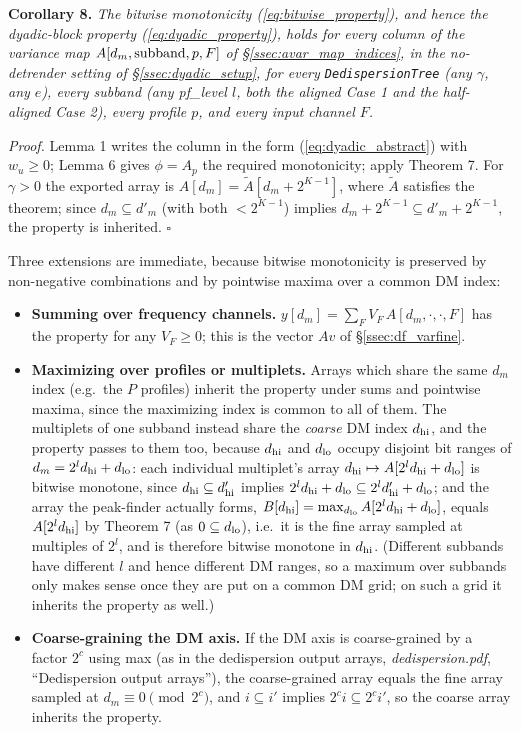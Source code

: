 \documentclass{article}
\numberwithin{equation}{section}   %
\newcommand{\ddnotes}[1]{{\em dedispersion.pdf}, ``#1''}
\begin{document}
\medskip
\par\noindent
{\bf Corollary 8.}
{\em The bitwise monotonicity (\ref{eq:bitwise_property}), and hence the dyadic-block property
(\ref{eq:dyadic_property}), holds for every column of the variance map
$A[d_m, \mbox{\rm subband}, p, F]$ of \S\ref{ssec:avar_map_indices}, in the no-detrender setting
of \S\ref{ssec:dyadic_setup}, for every {\tt DedispersionTree} (any $\gamma$, any $e$), every
subband (any pf\_level $l$, both the aligned Case 1 and the half-aligned Case 2), every
profile $p$, and every input channel $F$.}

\medskip
\par\noindent
{\em Proof.} Lemma 1 writes the column in the form (\ref{eq:dyadic_abstract}) with
$w_u \ge 0$; Lemma 6 gives $\phi = A_p$ the required monotonicity; apply Theorem 7. For
$\gamma>0$ the exported array is $A[d_m] = \tilde A[d_m + 2^{K-1}]$, where $\tilde A$
satisfies the theorem; since $d_m \subseteq d'_m$ (with both $< 2^{K-1}$) implies
$d_m + 2^{K-1} \subseteq d'_m + 2^{K-1}$, the property is inherited. $\square$

\medskip
\par\noindent
Three extensions are immediate, because bitwise monotonicity is preserved by non-negative
combinations and by pointwise maxima over a common DM index:
\begin{itemize}
\item {\bf Summing over frequency channels.} $y[d_m] = \sum_F V_F \, A[d_m,\cdot,\cdot,F]$
has the property for any $V_F \ge 0$; this is the vector $Av$ of \S\ref{ssec:df_varfine}.
\item {\bf Maximizing over profiles or multiplets.} Arrays which share the same $d_m$ index
(e.g.\ the $P$ profiles) inherit the property under sums and pointwise maxima, since the
maximizing index is common to all of them. The multiplets of one subband instead share the
{\em coarse} DM index $d_{\rm hi}$, and the property passes to them too, because $d_{\rm hi}$
and $d_{\rm lo}$ occupy disjoint bit ranges of $d_m = 2^l d_{\rm hi} + d_{\rm lo}$: each
individual multiplet's array $d_{\rm hi} \mapsto A[2^l d_{\rm hi} + d_{\rm lo}]$ is bitwise
monotone, since $d_{\rm hi} \subseteq d'_{\rm hi}$ implies
$2^l d_{\rm hi} + d_{\rm lo} \subseteq 2^l d'_{\rm hi} + d_{\rm lo}$; and the array the
peak-finder actually forms,
$B[d_{\rm hi}] = \max_{d_{\rm lo}} A[2^l d_{\rm hi} + d_{\rm lo}]$, equals
$A[2^l d_{\rm hi}]$ by Theorem 7 (as $0 \subseteq d_{\rm lo}$), i.e.\ it is the fine array
sampled at multiples of $2^l$, and is therefore bitwise monotone in $d_{\rm hi}$. (Different
subbands have different $l$ and hence different DM ranges, so a maximum over subbands only
makes sense once they are put on a common DM grid; on such a grid it inherits the property
as well.)
\item {\bf Coarse-graining the DM axis.} If the DM axis is coarse-grained by a factor $2^c$
using max (as in the dedispersion output arrays, \ddnotes{Dedispersion output arrays}),
the coarse-grained array equals the fine array sampled at $d_m \equiv 0 \pmod {2^c}$, and
$i \subseteq i'$ implies $2^c i \subseteq 2^c i'$, so the coarse array inherits the property.
\end{itemize}
\end{document}
